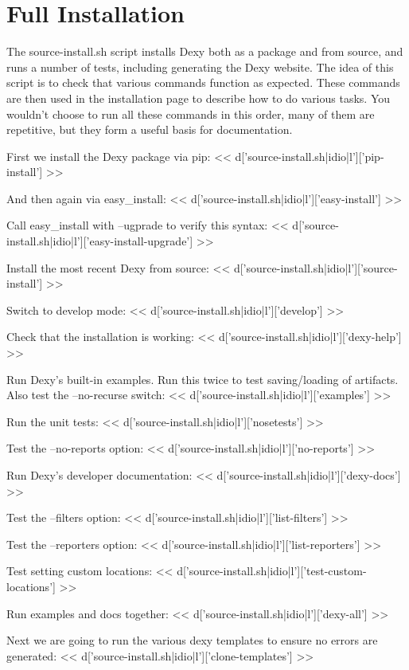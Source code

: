 \documentclass{tufte-handout}
\begin{document}
\section{Full Installation}

The source-install.sh script installs Dexy both as a package and from source, and runs a number of tests, including generating the Dexy website. The idea of this script is to check that various commands function as expected. These commands are then used in the installation page to describe how to do various tasks. You wouldn't choose to run all these commands in this order, many of them are repetitive, but they form a useful basis for documentation.

First we install the Dexy package via pip:
<< d['source-install.sh|idio|l']['pip-install'] >>

And then again via easy\_install:
<< d['source-install.sh|idio|l']['easy-install'] >>

Call easy\_install with --ugprade to verify this syntax:
<< d['source-install.sh|idio|l']['easy-install-upgrade'] >>

Install the most recent Dexy from source:
<< d['source-install.sh|idio|l']['source-install'] >>

Switch to develop mode:
<< d['source-install.sh|idio|l']['develop'] >>

Check that the installation is working:
<< d['source-install.sh|idio|l']['dexy-help'] >>

Run Dexy's built-in examples. Run this twice to test saving/loading of artifacts. Also test the --no-recurse switch:
<< d['source-install.sh|idio|l']['examples'] >>

Run the unit tests:
<< d['source-install.sh|idio|l']['nosetests'] >>

Test the --no-reports option:
<< d['source-install.sh|idio|l']['no-reports'] >>

Run Dexy's developer documentation:
<< d['source-install.sh|idio|l']['dexy-docs'] >>

Test the --filters option:
<< d['source-install.sh|idio|l']['list-filters'] >>

Test the --reporters option:
<< d['source-install.sh|idio|l']['list-reporters'] >>

Test setting custom locations:
<< d['source-install.sh|idio|l']['test-custom-locations'] >>

Run examples and docs together:
<< d['source-install.sh|idio|l']['dexy-all'] >>

Next we are going to run the various dexy templates to ensure no errors are generated:
<< d['source-install.sh|idio|l']['clone-templates'] >>
\end{document}

